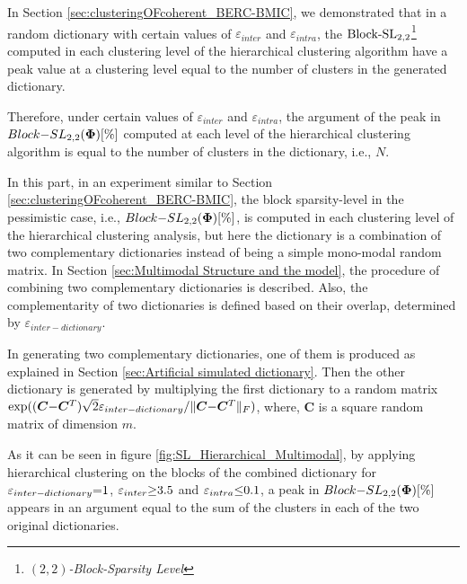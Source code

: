 In Section \ref{sec:clusteringOFcoherent_BERC-BMIC}, we demonstrated that in a random dictionary with certain values of $\varepsilon_{inter}$ and $\varepsilon_{intra}$, the $\mathrm{Block\text{{-}}SL}_{2,2}$\footnote{\emph{$(2,2)$-Block-Sparsity Level}} computed in each clustering level of the hierarchical clustering algorithm have a peak value at a clustering level equal to the number of clusters in the generated dictionary.

Therefore, under certain values of $\varepsilon_{inter}$ and $\varepsilon_{intra}$, the argument of the peak in $Block{-}SL_{2,2}(\boldsymbol{\Phi})[\%]$ computed at each level of the hierarchical clustering algorithm is equal to the number of clusters in the dictionary, i.e., $N$.

In this part, in an experiment similar to Section \ref{sec:clusteringOFcoherent_BERC-BMIC}, the block sparsity-level in the pessimistic case, i.e., $Block{-}SL_{2,2}(\boldsymbol{\Phi})[\%]$, is computed in each clustering level of the 
hierarchical clustering analysis, but here the dictionary 
is a combination of two complementary dictionaries instead of being a simple mono-modal random matrix.
In Section \ref{sec:Multimodal Structure and the model}, the procedure of combining two complementary dictionaries is described.
Also, the complementarity of two dictionaries is defined based on their overlap, determined by $\varepsilon_{inter-dictionary}$.

In generating two complementary dictionaries, one of them is produced as explained in Section \ref{sec:Artificial simulated dictionary}. 
Then the other dictionary is generated by multiplying the first dictionary to a random matrix $\exp((\boldsymbol{C} {-} \boldsymbol{C}^T) \sqrt{2} \varepsilon_{inter-dictionary} / \Vert \boldsymbol{C} {-} \boldsymbol{C}^T \Vert_F)$, where, $\boldsymbol{C}$ is a square random matrix of dimension $m$.

As it can be seen in figure \ref{fig:SL_Hierarchical_Multimodal}, by applying hierarchical clustering on the blocks of the combined dictionary for $\varepsilon_{inter-dictionary} {=} 1$, $\varepsilon_{inter} {\geq} 3.5$ and $\varepsilon_{intra} {\leq} 0.1$, a peak in $Block{-}SL_{2,2}(\boldsymbol{\Phi})[\%]$ appears in an argument equal to the sum of the clusters in each of the two original dictionaries.

